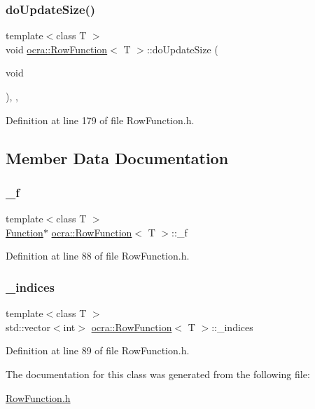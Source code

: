 \subsubsection{\texorpdfstring{do\+Update\+Size()}{doUpdateSize()}}
{\footnotesize\ttfamily template$<$class T $>$ \\
void \hyperlink{classocra_1_1RowFunction}{ocra\+::\+Row\+Function}$<$ T $>$\+::do\+Update\+Size (\begin{DoxyParamCaption}\item[{void}]{ }\end{DoxyParamCaption})\hspace{0.3cm}{\ttfamily [inline]}, {\ttfamily [protected]}, {\ttfamily [virtual]}}



Definition at line 179 of file Row\+Function.\+h.



\subsection{Member Data Documentation}
\hypertarget{classocra_1_1RowFunction_a336ba922ce93c2c1357b4298acfd0c2b}{}\label{classocra_1_1RowFunction_a336ba922ce93c2c1357b4298acfd0c2b} 
\subsubsection{\texorpdfstring{\+\_\+f}{\_f}}
{\footnotesize\ttfamily template$<$class T $>$ \\
\hyperlink{classocra_1_1Function}{Function}$\ast$ \hyperlink{classocra_1_1RowFunction}{ocra\+::\+Row\+Function}$<$ T $>$\+::\+\_\+f\hspace{0.3cm}{\ttfamily [protected]}}



Definition at line 88 of file Row\+Function.\+h.

\hypertarget{classocra_1_1RowFunction_afaa713596ca3c785cd9bb7599518ab0e}{}\label{classocra_1_1RowFunction_afaa713596ca3c785cd9bb7599518ab0e} 
\subsubsection{\texorpdfstring{\+\_\+indices}{\_indices}}
{\footnotesize\ttfamily template$<$class T $>$ \\
std\+::vector$<$int$>$ \hyperlink{classocra_1_1RowFunction}{ocra\+::\+Row\+Function}$<$ T $>$\+::\+\_\+indices\hspace{0.3cm}{\ttfamily [protected]}}



Definition at line 89 of file Row\+Function.\+h.



The documentation for this class was generated from the following file\+:\begin{DoxyCompactItemize}
\item 
\hyperlink{RowFunction_8h}{Row\+Function.\+h}\end{DoxyCompactItemize}

